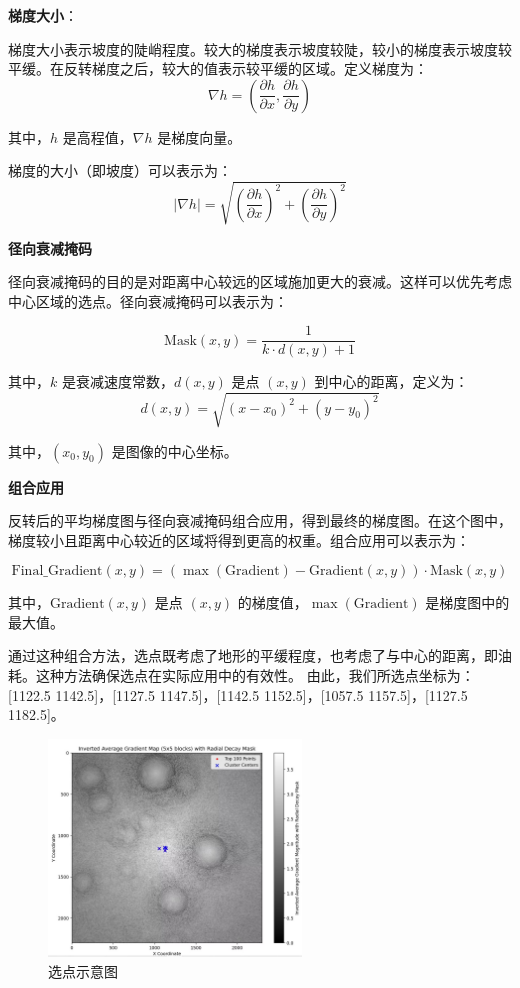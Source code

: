 \documentclass{ctexart}
\begin{document}
\textbf{梯度大小}：

梯度大小表示坡度的陡峭程度。较大的梯度表示坡度较陡，较小的梯度表示坡度较平缓。在反转梯度之后，较大的值表示较平缓的区域。定义梯度为：
\[
\nabla h = \left( \frac{\partial h}{\partial x}, \frac{\partial h}{\partial y} \right)
\]

其中，\( h \) 是高程值，\(\nabla h\) 是梯度向量。

梯度的大小（即坡度）可以表示为：
\[
|\nabla h| = \sqrt{\left( \frac{\partial h}{\partial x} \right)^2 + \left( \frac{\partial h}{\partial y} \right)^2}
\]

\textbf{径向衰减掩码}

径向衰减掩码的目的是对距离中心较远的区域施加更大的衰减。这样可以优先考虑中心区域的选点。径向衰减掩码可以表示为：

\[
\text{Mask}(x, y) = \frac{1}{k \cdot d(x, y) + 1}
\]

其中，\( k \) 是衰减速度常数，\( d(x, y) \) 是点 \((x, y)\) 到中心的距离，定义为：
\[
d(x, y) = \sqrt{(x - x_0)^2 + (y - y_0)^2}
\]

其中，\( (x_0, y_0) \) 是图像的中心坐标。

\textbf{组合应用}

反转后的平均梯度图与径向衰减掩码组合应用，得到最终的梯度图。在这个图中，梯度较小且距离中心较近的区域将得到更高的权重。组合应用可以表示为：

\[
\text{Final\_Gradient}(x, y) = (\max(\text{Gradient}) - \text{Gradient}(x, y)) \cdot \text{Mask}(x, y)
\]

其中，\(\text{Gradient}(x, y)\) 是点 \((x, y)\) 的梯度值，\(\max(\text{Gradient})\) 是梯度图中的最大值。

通过这种组合方法，选点既考虑了地形的平缓程度，也考虑了与中心的距离，即油耗。这种方法确保选点在实际应用中的有效性。
由此，我们所选点坐标为：[1122.5 1142.5]，[1127.5 1147.5]，[1142.5 1152.5]，[1057.5 1157.5]，[1127.5 1182.5]。

    \begin{figure}[H] %
        \centering %
        \includegraphics[width=0.6\textwidth]{"./picture/1.jpg"} %
        \caption{选点示意图} %
        \label{fig:example} %
    \end{figure}
\end{document}
